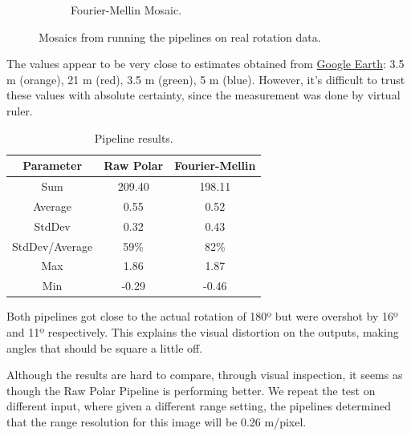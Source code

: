 \begin{figure}[H]
\begin{subfigure}[b]{0.47\textwidth}
        \caption{Fourier-Mellin Mosaic.}
    \end{subfigure}
    \label{fig:sonar-mosaic}
    \caption{Mosaics from running the pipelines on real rotation data.}
\end{figure}

The values appear to be very close to estimates obtained from \href{https://earth.google.com/web/@63.44158505,10.41727398,0.31239001a,140.28884032d,35y,151.00013963h,0t,0r/data=OgMKATA}{Google Earth}: 3.5 m (orange), 21 m (red), 3.5 m (green), 5 m (blue). However, it's difficult to trust these values with absolute certainty, since the measurement was done by virtual ruler.

\begin{table}[H]
    \centering
    \begin{tabular}{|c|c|c|}
        \hline
        \textbf{Parameter} & \textbf{Raw Polar} & \textbf{Fourier-Mellin} \\ \hline
        Sum & 209.40 & 198.11 \\ \hline
        Average & 0.55 & 0.52 \\ \hline
        StdDev & 0.32 & 0.43 \\ \hline
        StdDev/Average & 59\% & 82\% \\ \hline
        Max & 1.86 & 1.87 \\ \hline
        Min & -0.29 & -0.46 \\ \hline    
        \end{tabular}
    \caption{Pipeline results.}
\end{table}

Both pipelines got close to the actual rotation of 180º but were overshot by 16º and 11º respectively. This explains the visual distortion on the outputs, making angles that should be square a little off.   

Although the results are hard to compare, through visual inspection, it seems as though the Raw Polar Pipeline is performing better. We repeat the test on different input, where given a different range setting, the pipelines determined that the range resolution for this image will be 0.26 m/pixel.

